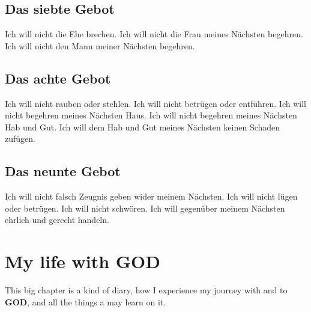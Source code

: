 \documentclass[12pt,a4paper]{article}
\newcommand{\God}[0]{\textbf{GOD}}
\newcommand{\Jesus}[0]{\textbf{JESUS}}
\newcommand{\q}[1]{\char"22{#1}\char"22 }
\begin{document}
	\subsection{Das siebte Gebot}
		Ich will nicht die Ehe brechen.
		Ich will nicht die Frau meines N\"achsten begehren.
		Ich will nicht den Mann meiner N\"achsten begehren.
		
	\subsection{Das achte Gebot}
		Ich will nicht rauben oder stehlen.
		Ich will nicht betr\"ugen oder entf\"uhren.
		Ich will nicht begehren meines N\"achsten Haus.
		Ich will nicht begehren meines N\"achsten Hab und Gut.
		Ich will dem Hab und Gut meines N\"achsten keinen Schaden zuf\"ugen.
		
	\subsection{Das neunte Gebot}
		Ich will nicht falsch Zeugnis geben wider meinem N\"achsten.
		Ich will nicht l\"ugen oder betr\"ugen.
		Ich will nicht schw\"oren.
		Ich will gegen\"uber meinem N\"achsten ehrlich und gerecht handeln.
		
%
	\section{My life with {\God}} \label{MeinLebenMitGott}
		This big chapter is a kind of diary,
		how I experience my journey with and to {\God},
		and all the things a may learn on it.
%	
\end{document}
